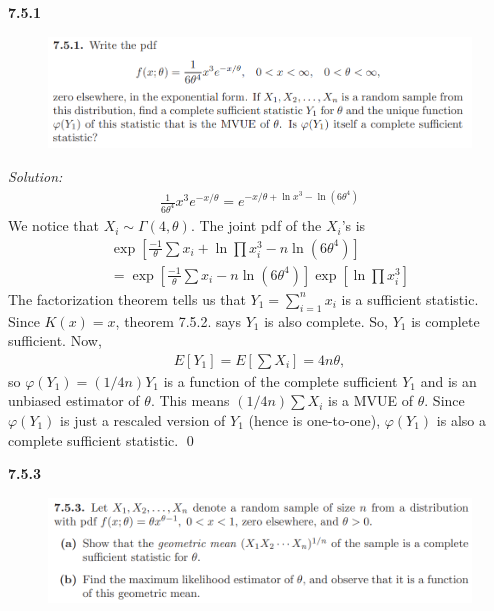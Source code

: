\documentclass{book}
\theoremstyle{definition}
\newcommand{\nn}{\nonumber}
\newcommand{\f}[2]{\frac{#1}{#2}}
\newcommand{\lb}{\left[}
\newcommand{\rb}{\right]}
\begin{document}
\newpage






\noindent\textbf{7.5.1}
\begin{figure}[!htb]
	\centering
	\includegraphics[scale=1]{751}
\end{figure}



\noindent \textit{Solution:} 
\begin{align}
\f{1}{6\theta^4}x^3 e^{-x/\theta} = e^{-x/\theta + \ln x^3 - \ln(6\theta^4)}
\end{align}
We notice that $X_i \sim \Gamma(4,\theta)$. The joint pdf of the $X_i$'s is 
\begin{align}
\exp\lb \f{-1}{\theta}\sum x_i + \ln  \prod x_i^3 - n\ln (6\theta^4)  \rb\nn\\
 = \exp \lb \f{-1}{\theta}\sum x_i - n\ln (6\theta^4)\rb \exp\lb \ln  \prod x_i^3  \rb
\end{align}
The factorization theorem tells us that $Y_1 = \sum^n_{i=1} x_i$ is a sufficient statistic. Since $K(x) = x$, theorem 7.5.2. says $Y_1$ is also complete. So, $Y_1$ is complete sufficient. Now, 
\begin{align*}
E[Y_1] = E\lb \sum X_i \rb = 4n\theta,
\end{align*}
so $\varphi(Y_1) = (1/4n)Y_1$ is a function of the complete sufficient $Y_1$ and is an unbiased estimator of $\theta$. This means $(1/4n)\sum X_i$ is a MVUE of $\theta$. Since $\varphi(Y_1)$ is just a rescaled version of $Y_1$ (hence is one-to-one), $\varphi(Y_1)$ is also a complete sufficient statistic. \qed



\newpage





\noindent\textbf{7.5.3}
\begin{figure}[!htb]
	\centering
	\includegraphics[scale=1]{753}
\end{figure}
\end{document}
